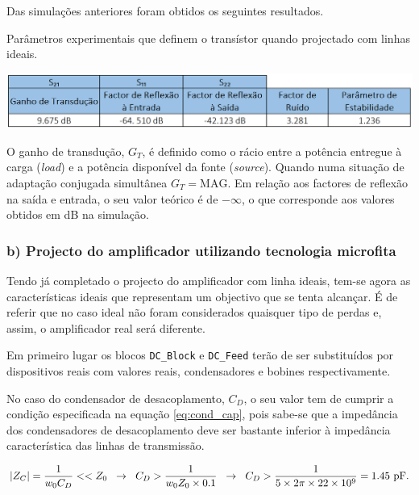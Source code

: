 \documentclass[11pt]{article}
\numberwithin{equation}{section}
\begin{document}
Das simulações anteriores foram obtidos os seguintes resultados.

\begin{table}[H]
	\centering
	\caption{Parâmetros experimentais que definem o transístor quando projectado com linhas ideais.}
	\vspace{-1.5mm}
	\includegraphics[keepaspectratio=true, scale=0.45]{exps/pergunta4}
\end{table}

O ganho de transdução, $G_T$, é definido como o rácio entre a potência entregue à carga (\textit{load}) e a potência disponível da fonte (\textit{source}). Quando numa situação de adaptação conjugada simultânea $G_T = \text{MAG}$. Em relação aos factores de reflexão na saída e entrada, o seu valor teórico é de $-\infty$, o que corresponde aos valores obtidos em dB na simulação. 

\subsubsection{b) Projecto do amplificador utilizando tecnologia microfita}

Tendo já completado o projecto do amplificador com linha ideais, tem-se agora as características ideais que representam um objectivo que se tenta alcançar. É de referir que no caso ideal não foram considerados quaisquer tipo de perdas e, assim, o amplificador real será diferente.

Em primeiro lugar os blocos \texttt{DC\_Block} e \texttt{DC\_Feed} terão de ser substituídos por dispositivos reais com valores reais, condensadores e bobines respectivamente. 

No caso do condensador de desacoplamento, $C_{D}$, o seu valor tem de cumprir a condição especificada na equação \ref{eq:cond_cap}, pois sabe-se que a impedância dos condensadores de desacoplamento deve ser bastante inferior à impedância característica das linhas de transmissão. 

\vspace{-3mm}
\begin{equation}
\lvert Z_C \rvert = \frac{1}{w_{0} C_{D}} << Z_0 \hspace{2mm} \rightarrow \hspace{2mm} C_{D} > \frac{1}{w_{0}Z_0 \times 0.1} \hspace{2mm} \rightarrow \hspace{2mm} C_{D} > \dfrac{1}{5 \times 2 \pi \times 22 \times 10^{9}} = 1.45~\text{pF}.
\label{eq:cond_cap}
\end{equation}
\end{document}
